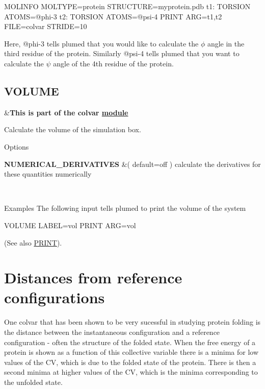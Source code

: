 \begin{DoxyVerb}MOLINFO MOLTYPE=protein STRUCTURE=myprotein.pdb
t1: TORSION ATOMS=@phi-3
t2: TORSION ATOMS=@psi-4
PRINT ARG=t1,t2 FILE=colvar STRIDE=10
\end{DoxyVerb}


Here, @phi-\/3 tells plumed that you would like to calculate the $\phi$ angle in the third residue of the protein. Similarly @psi-\/4 tells plumed that you want to calculate the $\psi$ angle of the 4th residue of the protein. \hypertarget{VOLUME}{}\subsection{V\+O\+L\+U\+M\+E}\label{VOLUME}
\begin{TabularC}{2}
\hline
&{\bfseries  This is part of the colvar \hyperlink{mymodules}{module }}   \\
\end{TabularC}
Calculate the volume of the simulation box.

\begin{DoxyParagraph}{Options}

\end{DoxyParagraph}
\begin{TabularC}{2}
\hline
{\bfseries  N\+U\+M\+E\+R\+I\+C\+A\+L\+\_\+\+D\+E\+R\+I\+V\+A\+T\+I\+V\+E\+S } &( default=off ) calculate the derivatives for these quantities numerically  

\\
\end{TabularC}


\begin{DoxyParagraph}{Examples}
The following input tells plumed to print the volume of the system \begin{DoxyVerb}VOLUME LABEL=vol
PRINT ARG=vol
\end{DoxyVerb}
 (See also \hyperlink{PRINT}{P\+R\+I\+N\+T}). 
\end{DoxyParagraph}
\hypertarget{dists}{}\section{Distances from reference configurations}\label{dists}
One colvar that has been shown to be very sucessful in studying protein folding is the distance between the instantaneous configuration and a reference configuration -\/ often the structure of the folded state. When the free energy of a protein is shown as a function of this collective variable there is a minima for low values of the C\+V, which is due to the folded state of the protein. There is then a second minima at higher values of the C\+V, which is the minima corresponding to the unfolded state.

